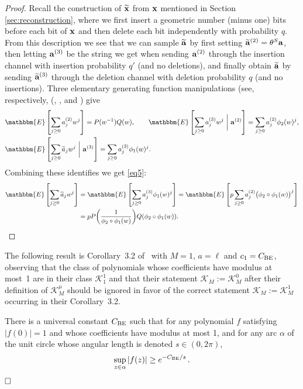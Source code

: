 \documentclass[final,12pt]{colt2018} %
\newcommand{\E}{\mathbbm{E}}
\newcommand{\1}{\mathbf{1}}
\def\Cox{\hfill \Box}
\newcommand{\eqbn}{\begin{equation*}}
\newcommand{\eqen}{\end{equation*}}
\newcommand{\wt}{\widetilde}
\def\xt{{\wt {\bf x}}}
\def\x{{\bf x}}
\def\a{{\bf a}}
\def\cbe{C_{\rm BE}}
\begin{document}
\begin{proof}
	Recall the construction of $\xt$ from $\x$ mentioned in
	Section \ref{sec:reconstruction}, where we first insert a geometric number (minus one) bits before each bit of $\x$ and then delete each bit independently with probability $q$. From this
	description we see that we can sample $\wt\a$ by first setting $\wt\a^{(2)}=\theta^S\a$, then letting $\a^{(3)}$ be the string we get when sending $\a^{(2)}$ through the insertion channel with insertion probability $q'$ (and no deletions), and
	finally obtain $\wt\a$ by sending $\wt\a^{(3)}$ through the deletion channel with deletion probability $q$ (and no insertions).
	Three elementary generating function manipulations (see, respectively,
	(\cite[Lemma 4.2]{PZ17}, \cite[Lemma 5.2]{NP16}, and \cite[Lemma 2.1]{NP16}) give
	\eqbn
	\begin{split}
		&\E\left[ \sum_{j\geq 0} a_j^{(2)} w^j \right] = P(w^{-1})Q(w),\qquad
		\E\left[ \sum_{j\geq 0} a_j^{(3)} w^j \,\,\bigg|\,\,\a^{(2)}\right] = \sum_{j\geq 0} a_j^{(2)} \phi_2(w)^j,\\
		&\E\left[ \sum_{j\geq 0} \wt a_j w^j\,\,\bigg|\,\,\a^{(3)} \right] = \sum_{j\geq 0} a_j^{(3)} \phi_1(w)^j.
	\end{split}
	\eqen
	Combining these identifies we get \eqref{eq5}:
	\eqbn
	\begin{split}
		\E\left[ \sum_{j\geq 0} \wt a_j w^j \right]
		&= \E\left[\sum_{j\geq 0} a_j^{(3)} \phi_1(w)^j\right]
		= \E\left[p\sum_{j\geq 0} a_j^{(2)} \big(\phi_2\circ \phi_1(w)\big)^j\right]\\
		&=pP\bigg(\frac{1}{\phi_2\circ \phi_1(w)}\bigg)Q(\phi_2\circ \phi_1(w)).
	\end{split}
	\eqen
\end{proof}

The following result is Corollary~3.2 of~\cite{BE97} with $M=1$,
$a = \ell$ and $c_1 = \cbe$, observing that the class of polynomials
whose coefficients have modulus at most~1 are in their class
${\mathcal K}_1^1$ and that their statement ${\mathcal K}_M
:= {\mathcal K}_M^0$ after their definition of ${\mathcal K}_M^\mu$
should be ignored in favor of the correct statement
${\mathcal K}_M := {\mathcal K}_M^1$ occurring in their Corollary~3.2.
%
\begin{lemma} \label{lem:BE}
	There is a universal constant $\cbe$ such that for any polynomial $f$ satisfying $|f(0)|=1$ and whose coefficients have modulus at most 1, and for any arc $\alpha$ of the unit circle whose angular length is denoted $s \in (0,2\pi)$, $$\sup_{z \in \alpha} |f(z)| \geq e^{-\cbe / s} \, .$$
	$\Cox$
\end{lemma}
\end{document}
